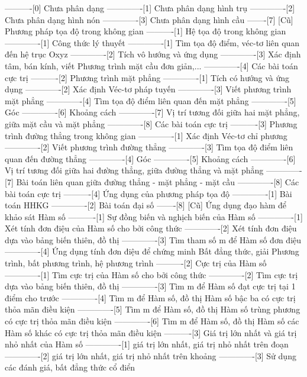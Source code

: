 ----------[0] Chưa phân dạng
-------------[1] Chưa phân dạng hình trụ
-------------[2] Chưa phân dạng hình nón
-------------[3] Chưa phân dạng hình cầu
-------[7] [Cũ] Phương pháp tọa độ trong không gian
----------[1] Hệ tọa độ trong không gian
-------------[1] Công thức lý thuyết
-------------[1] Tìm tọa độ điểm, véc-tơ liên quan đến hệ trục Oxyz
-------------[2] Tích vô hướng và ứng dụng
-------------[3] Xác định tâm, bán kính, viết Phương trình mặt cầu đơn giản,...
-------------[4] Các bài toán cực trị
----------[2] Phương trình mặt phẳng
-------------[1] Tích có hướng và ứng dụng
-------------[2] Xác định Véc-tơ pháp tuyến
-------------[3] Viết phương trình mặt phẳng
-------------[4] Tìm tọa độ điểm liên quan đến mặt phẳng
-------------[5] Góc
-------------[6] Khoảng cách
-------------[7] Vị trí tương đối giữa hai mặt phẳng, giữa mặt cầu và mặt phẳng
-------------[8] Các bài toán cực trị
----------[3] Phương trình đường thẳng trong không gian
-------------[1] Xác định Véc-tơ chỉ phương
-------------[2] Viết phương trình đường thẳng
-------------[3] Tìm tọa độ điểm liên quan đến đường thẳng
-------------[4] Góc
-------------[5] Khoảng cách
-------------[6] Vị trí tương đối giữa hai đường thẳng, giữa đường thẳng và mặt phẳng
-------------[7] Bài toán liên quan giữa đường thẳng - mặt phẳng - mặt cầu
-------------[8] Các bài toán cực trị
----------[4] Ứng dụng của phương pháp tọa độ
-------------[1] Bài toán HHKG
-------------[2] Bài toán đại số
-------[8] [Cũ] Ứng dụng đạo hàm để khảo sát Hàm số
----------[1] Sự đồng biến và nghịch biến của Hàm số
-------------[1] Xét tính đơn điệu của Hàm số cho bởi công thức
-------------[2] Xét tính đơn điệu dựa vào bảng biến thiên, đồ thị
-------------[3] Tìm tham số m để Hàm số đơn điệu
-------------[4] Ứng dụng tính đơn điệu để chứng minh Bất đẳng thức, giải Phương trình, bất phương trình, hệ phương trình
----------[2] Cực trị của Hàm số
-------------[1] Tìm cực trị của Hàm số cho bởi công thức
-------------[2] Tìm cực trị dựa vào bảng biến thiên, đồ thị
-------------[3] Tìm m để Hàm số đạt cực trị tại 1 điểm cho trước
-------------[4] Tìm m để Hàm số, đồ thị Hàm số bậc ba có cực trị thỏa mãn điều kiện
-------------[5] Tìm m để Hàm số, đồ thị Hàm số trùng phương có cực trị thỏa mãn điều kiện
-------------[6] Tìm m để Hàm số, đồ thị Hàm số các Hàm số khác có cực trị thỏa mãn điều kiện
----------[3] Giá trị lớn nhất và giá trị nhỏ nhất của Hàm số
-------------[1] giá trị lớn nhất, giá trị nhỏ nhất trên đoạn
-------------[2] giá trị lớn nhất, giá trị nhỏ nhất trên khoảng
-------------[3] Sử dụng các đánh giá, bất đẳng thức cổ điển
